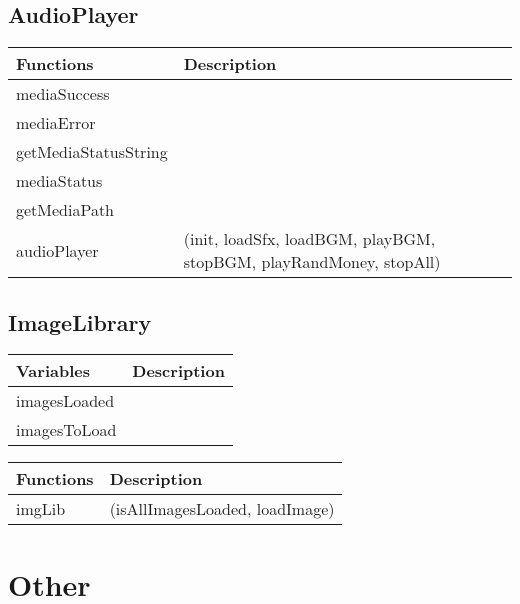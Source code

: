 	



\subsection*{AudioPlayer}

	\begin{table}[H]
	\begin{tabular}{p{4cm} | p{8cm} }
	\hline
	\rowcolor{gray}
	Functions & Description \\ \hline
	mediaSuccess & \\ \hline
	mediaError & \\ \hline
	getMediaStatusString & \\ \hline
	mediaStatus & \\ \hline
	getMediaPath & \\ \hline
	audioPlayer & (init, loadSfx, loadBGM, playBGM, stopBGM, playRandMoney, stopAll) \\ \hline
	\end{tabular}
	\end{table}



\subsection*{ImageLibrary}
	
	\begin{table}[H]
	\begin{tabular}{p{4cm} | p{8cm} }
	\hline
	\rowcolor{gray}
	Variables & Description \\ \hline
	imagesLoaded & \\ \hline
	imagesToLoad & \\ \hline
	\end{tabular}
	\end{table}

	\begin{table}[H]
	\begin{tabular}{p{4cm} | p{8cm} }
	\hline
	\rowcolor{gray}
	Functions & Description \\ \hline
	imgLib & (isAllImagesLoaded, loadImage) \\ \hline	
	\end{tabular}
	\end{table}

\clearpage

\section{Other}

